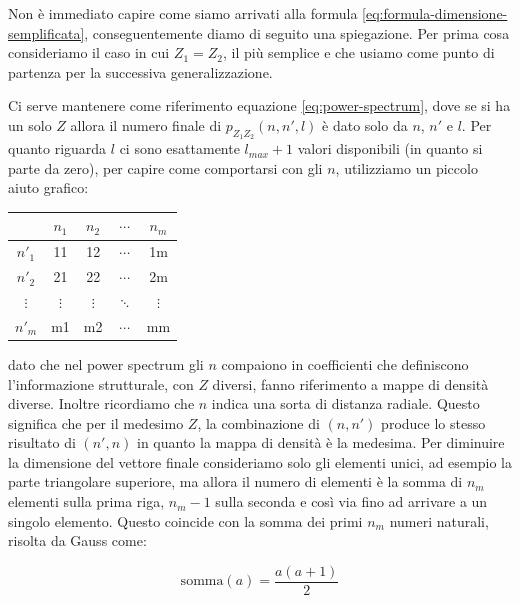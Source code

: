 \label{app:dimpowspec}

Non è immediato capire come siamo arrivati alla  formula \eqref{eq:formula-dimensione-semplificata}, conseguentemente diamo di seguito una spiegazione. Per prima cosa consideriamo il caso in cui $Z_1 = Z_2$, il più semplice e che usiamo come punto di partenza per la successiva generalizzazione.

Ci serve mantenere come riferimento equazione \eqref{eq:power-spectrum}, dove se si ha un solo $Z$ allora il numero finale di $p_{Z_1Z_2}(n,n',l)$ è dato solo da $n$, $n'$ e $l$. Per quanto riguarda $l$ ci sono esattamente $l_{max} + 1$ valori disponibili (in quanto si parte da zero), per capire come comportarsi con gli $n$, utilizziamo un piccolo aiuto grafico:

\begin{table}[h]
    \centering
    \begin{tabular}{c|cccc}
                 & $n_1$    & $n_2$    & $\cdots$ & $n_m$\\ \hline
        $n'_1$   &   11     &   12     & $\cdots$ & 1m\\ 
        $n'_2$   &   21     &   22     & $\cdots$ & 2m\\ 
        $\vdots$ & $\vdots$ & $\vdots$ & $\ddots$ & $\vdots$\\ 
        $n'_m$   &   m1     &   m2     & $\cdots$ & mm\\ 
    \end{tabular}
    \label{sch:tabella-coefficienti-n-combinazione-power-spectrum}
\end{table}

dato che nel power spectrum gli $n$ compaiono in coefficienti che definiscono l'informazione strutturale, con $Z$ diversi, fanno riferimento a mappe di densità diverse. Inoltre ricordiamo che $n$ indica una sorta di distanza radiale. Questo significa che per il medesimo $Z$, la combinazione di $(n, n')$ produce lo stesso risultato di $(n', n)$ in quanto la mappa di densità è la medesima. Per diminuire la dimensione del vettore finale consideriamo solo gli elementi unici, ad esempio la parte triangolare superiore, ma allora il numero di elementi è la somma di $n_m$ elementi sulla prima riga, $n_m - 1$ sulla seconda e così via fino ad arrivare a un singolo elemento. Questo coincide con la somma dei primi $n_m$ numeri naturali, risolta da Gauss come:

\begin{equation}
    \mathrm{somma}(a) = \frac{a(a + 1)}{2}
    \label{eq:somma-gauss-naturali}
\end{equation}

